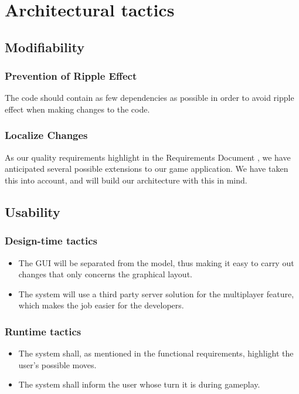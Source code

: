 

\section{Architectural tactics}

\subsection{Modifiability}                       

\subsubsection{Prevention of Ripple Effect}
The code should contain as few dependencies as possible in order to avoid ripple effect when making changes to the code.

\subsubsection{Localize Changes}
As our quality requirements highlight in the Requirements Document \cite{requirement}, we have anticipated several possible extensions to our game application. We have taken this into account, and will build our architecture with this in mind.

\subsection{Usability}

\subsubsection{Design-time tactics}
\begin{itemize}
\item The GUI will be separated from the model, thus making it easy to carry out changes that only concerns the graphical layout.
\item The system will use a third party server solution for the multiplayer feature, which makes the job easier for the developers.
\end{itemize}

\subsubsection{Runtime tactics}
\begin{itemize}
\item The system shall, as mentioned in the functional requirements, highlight the user's possible moves.
\item The system shall inform the user whose turn it is during gameplay. 
\end{itemize}

